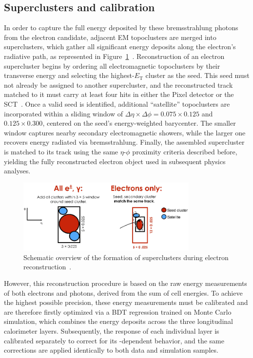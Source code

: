 \subsection{Superclusters and calibration}

In order to capture the full energy deposited by these bremsstrahlung photons from the electron candidate, adjacent EM topoclusters are merged into superclusters, which gather all significant energy deposits along the electron’s radiative path, as represented in Figure~\ref{fig:superclust}~\cite{Aad:2684552}.
\FloatBarrier
Reconstruction of an electron supercluster begins by ordering all electromagnetic topoclusters by their transverse energy and selecting the highest-$E_{\text{T}}$ cluster as the seed. This seed must not already be assigned to another supercluster, and the reconstructed track matched to it must carry at least four hits in either the Pixel detector or the SCT~\cite{Aad:2684552}. Once a valid seed is identified, additional “satellite” topoclusters are incorporated within a sliding window of \(\Delta\eta\times\Delta\phi = 0.075\times0.125\) and \(0.125\times0.300\), centered on the seed’s energy-weighted barycenter. The smaller window captures nearby secondary electromagnetic showers, while the larger one recovers energy radiated via bremsstrahlung. Finally, the assembled supercluster is matched to its track using the same \(\eta\)-\(\phi\) proximity criteria described before, yielding the fully reconstructed electron object used in subsequent physics analyses.  

\begin{figure}[htbp]
  \centering
  \includegraphics[width=0.8\textwidth]{images/superclusters.png}
  \caption{Schematic overview of the formation of superclusters during electron reconstruction~\cite{Aad:2684552}.}
  \label{fig:superclust}
\end{figure}

However, this reconstruction procedure is based on the raw energy measurements of both electrons and photons, derived from the sum of cell energies. To achieve the highest possible precision, these energy measurements must be calibrated and are therefore firstly optimized via a BDT regression trained on Monte Carlo simulation, which combines the energy deposits across the three longitudinal calorimeter layers. Subsequently, the response of each individual layer is calibrated separately to correct for its \et-dependent behavior, and the same corrections are applied identically to both data and simulation samples.

